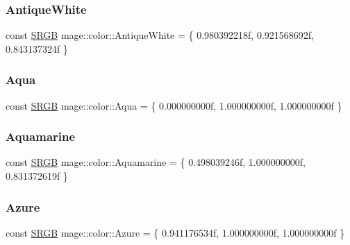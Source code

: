 \subsubsection{\texorpdfstring{Antique\+White}{AntiqueWhite}}
{\footnotesize\ttfamily const \hyperlink{structmage_1_1_s_r_g_b}{S\+R\+GB} mage\+::color\+::\+Antique\+White = \{ 0.\+980392218f, 0.\+921568692f, 0.\+843137324f \}}

\hypertarget{namespacemage_1_1color_ab385e0cab02efdce031a572e099f2d63}{}\label{namespacemage_1_1color_ab385e0cab02efdce031a572e099f2d63} 
\subsubsection{\texorpdfstring{Aqua}{Aqua}}
{\footnotesize\ttfamily const \hyperlink{structmage_1_1_s_r_g_b}{S\+R\+GB} mage\+::color\+::\+Aqua = \{ 0.\+000000000f, 1.\+000000000f, 1.\+000000000f \}}

\hypertarget{namespacemage_1_1color_ab3cece3a6dac9ae00256df815206c0aa}{}\label{namespacemage_1_1color_ab3cece3a6dac9ae00256df815206c0aa} 
\subsubsection{\texorpdfstring{Aquamarine}{Aquamarine}}
{\footnotesize\ttfamily const \hyperlink{structmage_1_1_s_r_g_b}{S\+R\+GB} mage\+::color\+::\+Aquamarine = \{ 0.\+498039246f, 1.\+000000000f, 0.\+831372619f \}}

\hypertarget{namespacemage_1_1color_aea8fcbc7898b52bbd11451a8ab02ab3c}{}\label{namespacemage_1_1color_aea8fcbc7898b52bbd11451a8ab02ab3c} 
\subsubsection{\texorpdfstring{Azure}{Azure}}
{\footnotesize\ttfamily const \hyperlink{structmage_1_1_s_r_g_b}{S\+R\+GB} mage\+::color\+::\+Azure = \{ 0.\+941176534f, 1.\+000000000f, 1.\+000000000f \}}

\hypertarget{namespacemage_1_1color_aa01771f207dd193a3c3115a1729d6aa1}{}\label{namespacemage_1_1color_aa01771f207dd193a3c3115a1729d6aa1} 
